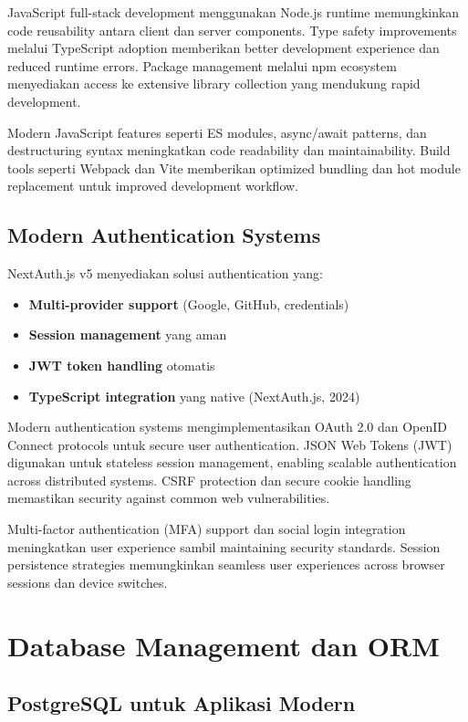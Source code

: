JavaScript full-stack development menggunakan Node.js runtime memungkinkan code reusability antara client dan server components. Type safety improvements melalui TypeScript adoption memberikan better development experience dan reduced runtime errors. Package management melalui npm ecosystem menyediakan access ke extensive library collection yang mendukung rapid development.

Modern JavaScript features seperti ES modules, async/await patterns, dan destructuring syntax meningkatkan code readability dan maintainability. Build tools seperti Webpack dan Vite memberikan optimized bundling dan hot module replacement untuk improved development workflow.

\subsection{Modern Authentication Systems}

NextAuth.js v5 menyediakan solusi authentication yang:

\begin{itemize}
\item \textbf{Multi-provider support} (Google, GitHub, credentials)
\item \textbf{Session management} yang aman
\item \textbf{JWT token handling} otomatis
\item \textbf{TypeScript integration} yang native (NextAuth.js, 2024)
\end{itemize}

Modern authentication systems mengimplementasikan OAuth 2.0 dan OpenID Connect protocols untuk secure user authentication. JSON Web Tokens (JWT) digunakan untuk stateless session management, enabling scalable authentication across distributed systems. CSRF protection dan secure cookie handling memastikan security against common web vulnerabilities.

Multi-factor authentication (MFA) support dan social login integration meningkatkan user experience sambil maintaining security standards. Session persistence strategies memungkinkan seamless user experiences across browser sessions dan device switches.

\section{Database Management dan ORM}

\subsection{PostgreSQL untuk Aplikasi Modern}

